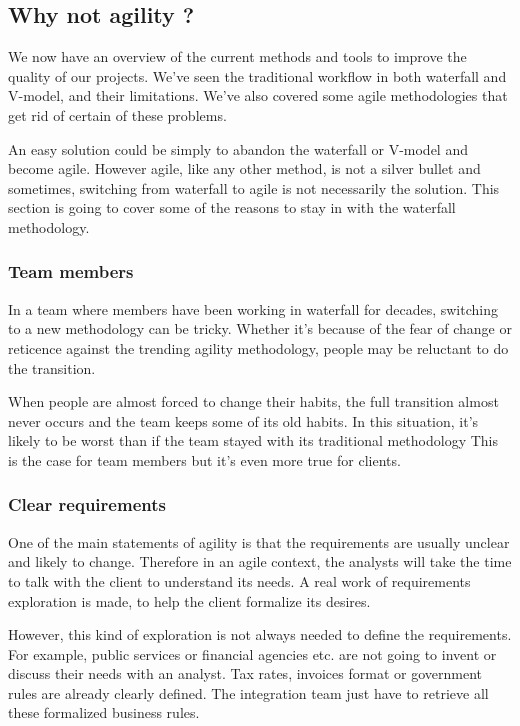 \subsection{Why not agility ?}\label{subsec:whby-not-agility}


We now have an overview of the current methods and tools to improve the
quality of our projects.
We've seen the traditional workflow in both waterfall and V-model, and their
limitations.
We've also covered some agile methodologies that get rid of certain of these
problems.

An easy solution could be simply to abandon the waterfall or V-model and become
agile.
However agile, like any other method, is not a silver bullet and sometimes,
switching from waterfall to agile is not necessarily the solution.
This section is going to cover some of the reasons to stay in with the
waterfall methodology.

\subsubsection{Team members}
In a team where members have been working in waterfall for decades, switching
to a new methodology can be tricky.
Whether it's because of the fear of change or reticence against the
trending agility methodology, people may be reluctant to do the transition.

When people are almost forced to change their habits, the full transition
almost never occurs and the team keeps some of its old habits.
In this situation, it's likely to be worst than if the team stayed with its
traditional methodology
This is the case for team members but it's even more true for clients.

\subsubsection{Clear requirements}
One of the main statements of agility is that the requirements are usually
unclear and likely to change.
Therefore in an agile context, the analysts will take the time to talk with
the client to understand its needs.
A real work of requirements exploration is made, to help the client
formalize its desires.

However, this kind of exploration is not always needed to define the
requirements.
For example, public services or financial agencies etc.
are not going to invent or discuss their needs with an analyst.
Tax rates, invoices format or government rules are already clearly defined.
The integration team just have to retrieve all these formalized business rules.

